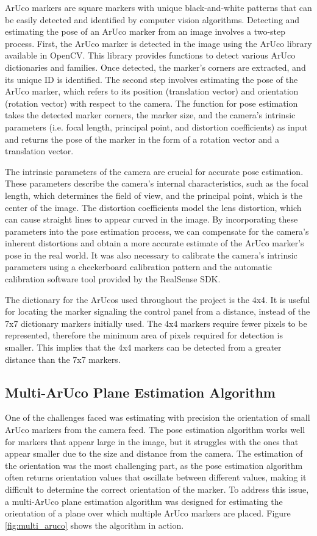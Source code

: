 ArUco markers are square markers with unique black-and-white patterns that can be easily detected
and identified by computer vision algorithms.
Detecting and estimating the pose of an ArUco marker from an image involves a two-step process.
First, the ArUco marker is detected in the image using the ArUco library available in OpenCV. 
This library provides functions to detect various ArUco dictionaries and families. 
Once detected, the marker's corners are extracted, and its unique ID is identified. 
The second step involves estimating the pose of the ArUco marker, which refers to its position 
(translation vector) and orientation (rotation vector) with respect to the camera. The function for pose estimation 
takes the detected marker corners, the marker size, and the camera's intrinsic parameters (i.e. focal length,
principal point, and distortion coefficients) as input and returns the pose of the marker in the form of a rotation
vector and a translation vector.

The intrinsic parameters of the camera are crucial for accurate pose estimation. These parameters describe the camera's
internal characteristics, such as the focal length, which determines the field of view, and the principal point,
which is the center of the image. The distortion coefficients model the lens distortion, which can cause straight
lines to appear curved in the image. By incorporating these parameters into the pose estimation process,
we can compensate for the camera's inherent distortions and obtain a more accurate estimate of the ArUco marker's pose
in the real world. It was also necessary to calibrate the camera's intrinsic parameters using a checkerboard
calibration pattern and the automatic calibration software tool provided by the RealSense SDK.

The dictionary for the ArUcos used throughout the project is the 4x4. It is useful for locating the marker signaling
the control panel from a distance, instead of the 7x7 dictionary markers initially used.
The 4x4 markers require fewer pixels to be represented, therefore the minimum area of pixels required
for detection is smaller. This implies that the 4x4 markers can be detected from a greater distance than the 7x7 markers.

\subsection{Multi-ArUco Plane Estimation Algorithm}

One of the challenges faced was estimating with precision the orientation of small ArUco markers from the camera feed.
The pose estimation algorithm works well for markers that appear large in the image, but it struggles with
the ones that appear smaller due to the size and distance from the camera. The estimation of the orientation
was the most challenging part, as the pose estimation algorithm often returns orientation values that
oscillate between different values, making it difficult to determine the correct orientation of the marker.
To address this issue, a multi-ArUco plane estimation algorithm was designed for estimating the orientation of a plane over which
multiple ArUco markers are placed. Figure \ref{fig:multi_aruco} shows the algorithm in action.

